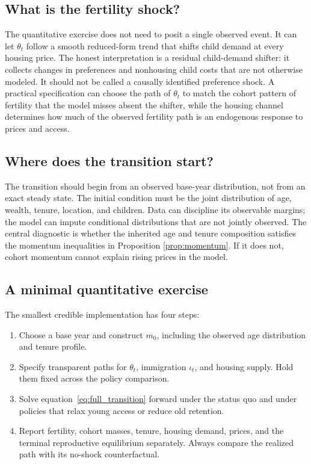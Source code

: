 \documentclass[11pt]{article}
\theoremstyle{definition}
\begin{document}
\subsection*{What is the fertility shock?}

The quantitative exercise does not need to posit a single observed event. It
can let $\theta_t$ follow a smooth reduced-form trend that shifts child demand
at every housing price. The honest interpretation is a residual child-demand
shifter: it collects changes in preferences and nonhousing child costs that are
not otherwise modeled. It should not be called a causally identified preference
shock. A practical specification can choose the path of $\theta_t$ to match the
cohort pattern of fertility that the model misses absent the shifter, while the
housing channel determines how much of the observed fertility path is an
endogenous response to prices and access.

\subsection*{Where does the transition start?}

The transition should begin from an observed base-year distribution, not from
an exact steady state. The initial condition must be the joint distribution of
age, wealth, tenure, location, and children. Data can discipline its observable
margins; the model can impute conditional distributions that are not jointly
observed. The central diagnostic is whether the inherited age and tenure
composition satisfies the momentum inequalities in Proposition
\ref{prop:momentum}. If it does not, cohort momentum cannot explain rising
prices in the model.

\subsection*{A minimal quantitative exercise}

The smallest credible implementation has four steps:
\begin{enumerate}
 \item Choose a base year and construct $m_0$, including the observed age
 distribution and tenure profile.
 \item Specify transparent paths for $\theta_t$, immigration $\iota_t$, and
 housing supply. Hold them fixed across the policy comparison.
 \item Solve equation~\eqref{eq:full_transition} forward under the status quo
 and under policies that relax young access or reduce old retention.
 \item Report fertility, cohort masses, tenure, housing demand, prices, and the
 terminal reproductive equilibrium separately. Always compare the realized
 path with its no-shock counterfactual.
\end{enumerate}
\end{document}

